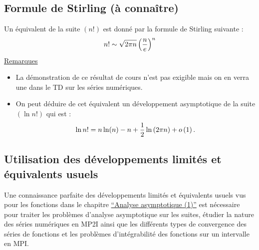 \subsection{Formule de Stirling (à connaître)}
\begin{defprop}
    Un équivalent de la suite \((n!)\) est donné par la formule de Stirling suivante :
    \[n! \sim \sqrt{2\pi n} \left(\frac{n}{e}\right)^n\]
    \underline{Remarques}\\
    \begin{itemize}
        \item La démonstration de ce résultat de cours n’est pas exigible mais on en verra une dans le TD sur les séries numériques.
        \item On peut déduire de cet équivalent un développement asymptotique de la suite \((\ln n!)\) qui est :
        \[\ln n! = n \ln (n) - n + \frac{1}{2} \ln \left(2 \pi n\right) + o\left(1\right).\]
    \end{itemize}
\end{defprop}

\subsection{Utilisation des développements limités et équivalents usuels}
\begin{defprop}
    Une connaissance parfaite des développements limités et équivalents usuels vus pour les fonctions dans le chapitre \hyperref[chap:analyse-asymptotique1]{“Analyse asymptotique (1)”} est nécessaire pour traiter les problèmes d’analyse asymptotique sur les suites, étudier la nature des séries numériques en MP2I ainsi que les différents types de convergence des séries de fonctions et les problèmes d’intégrabilité des fonctions sur un intervalle en MPI.
\end{defprop}